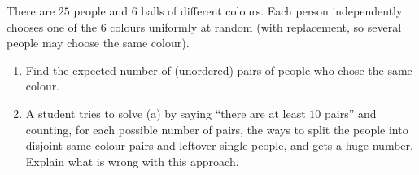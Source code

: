 There are $25$ people and $6$ balls of different colours. Each person independently chooses one of the $6$ colours uniformly at random (with replacement, so several people may choose the same colour).
\begin{enumerate}
\item[(a)] Find the expected number of (unordered) pairs of people who chose the same colour.
\item[(b)] A student tries to solve (a) by saying ``there are at least $10$ pairs'' and counting, for each possible number of pairs, the ways to split the people into disjoint same-colour pairs and leftover single people, and gets a huge number. Explain what is wrong with this approach.
\end{enumerate}
